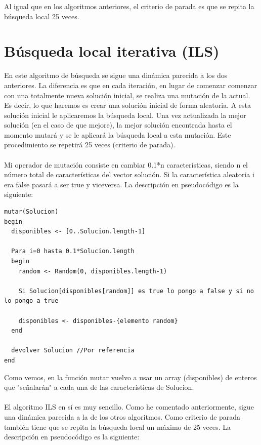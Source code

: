 Al igual que en los algoritmos anteriores, el criterio de parada es que se repita la búsqueda local 25 veces.


\section{Búsqueda local iterativa (ILS)}
En este algoritmo de búsqueda se sigue una dinámica parecida a los dos anteriores. La diferencia es que en cada iteración, en lugar de comenzar comenzar con una totalmente nueva solución inicial, se realiza una mutación de la actual. Es decir, lo que haremos es crear una solución inicial de forma aleatoria. A esta solución inicial le aplicaremos la búsqueda local. Una vez actualizada la mejor solución (en el caso de que mejore), la mejor solución encontrada hasta el momento mutará y se le aplicará la búsqueda local a esta mutación. Este procedimiento se repetirá 25 veces (criterio de parada).
\\
\\
Mi operador de mutación consiste en cambiar 0.1*n características, siendo n el número total de características del vector solución. Si la característica aleatoria i era false pasará a ser true y viceversa. La descripción en pseudocódigo es la siguiente:
\begin{lstlisting}
mutar(Solucion)
begin
  disponibles <- [0..Solucion.length-1]
  
  Para i=0 hasta 0.1*Solucion.length
  begin
    random <- Random(0, disponibles.length-1)
    
    Si Solucion[disponibles[random]] es true lo pongo a false y si no lo pongo a true
    
    disponibles <- disponibles-{elemento random}
  end
  
  devolver Solucion //Por referencia
end
\end{lstlisting}
Como vemos, en la función mutar vuelvo a usar un array (disponibles) de enteros que "señalarán" a cada una de las características de Solucion.
\\
\\
El algoritmo ILS en sí es muy sencillo. Como he comentado anteriormente, sigue una dinámica parecida a la de los otros algoritmos. Como criterio de parada también tiene que se repita la búsqueda local un máximo de 25 veces. La descripción en pseudocódigo es la siguiente:
